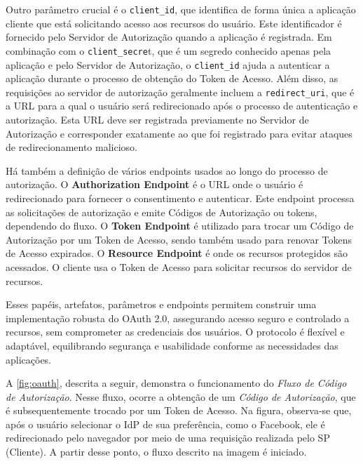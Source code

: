 Outro parâmetro crucial é o \texttt{client\_id}, que identifica de forma única a aplicação cliente que está solicitando acesso aos recursos do usuário. Este identificador é fornecido pelo Servidor de Autorização quando a aplicação é registrada. Em combinação com o \texttt{client\_secre}t, que é um segredo conhecido apenas pela aplicação e pelo Servidor de Autorização, o \texttt{client\_id} ajuda a autenticar a aplicação durante o processo de obtenção do Token de Acesso. Além disso, as requisições ao servidor de autorização geralmente incluem a \texttt{redirect\_uri}, que é a URL para a qual o usuário será redirecionado após o processo de autenticação e autorização. Esta URL deve ser registrada previamente no Servidor de Autorização e corresponder exatamente ao que foi registrado para evitar ataques de redirecionamento malicioso.

Há também a definição de vários endpoints usados ao longo do processo de autorização. O \textbf{Authorization Endpoint} é o URL onde o usuário é redirecionado para fornecer o consentimento e autenticar. Este endpoint processa as solicitações de autorização e emite Códigos de Autorização ou tokens, dependendo do fluxo. O \textbf{Token Endpoint} é utilizado para trocar um Código de Autorização por um Token de Acesso, sendo também usado para renovar Tokens de Acesso expirados. O \textbf{Resource Endpoint} é onde os recursos protegidos são acessados. O cliente usa o Token de Acesso para solicitar recursos do servidor de recursos.

Esses papéis, artefatos, parâmetros e endpoints permitem construir uma implementação robusta do OAuth 2.0, assegurando acesso seguro e controlado a recursos, sem comprometer as credenciais dos usuários. O protocolo é flexível e adaptável, equilibrando segurança e usabilidade conforme as necessidades das aplicações.

A \autoref{fig:oauth}, descrita a seguir, demonstra o funcionamento do \emph{Fluxo de Código de Autorização}. Nesse fluxo, ocorre a obtenção de um \emph{Código de Autorização}, que é subsequentemente trocado por um Token de Acesso. Na figura, observa-se que, após o usuário selecionar o \acs{IdP} de sua preferência, como o Facebook, ele é redirecionado pelo navegador por meio de uma requisição realizada pelo \acs{SP} (Cliente). A partir desse ponto, o fluxo descrito na imagem é iniciado.


